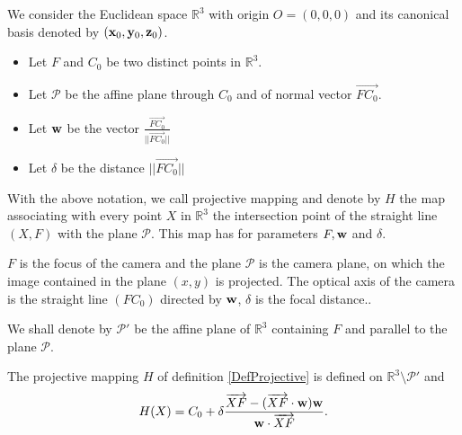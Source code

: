 We consider the Euclidean space $\mathbb{R}^3$ with origin $O=(0,0,0)$ and its canonical basis denoted by $(\mathbf{x}_0,\mathbf{y}_0,\mathbf{z}_0)$.
\begin{itemize}
\item Let $F$ and $C_0$ be two distinct points in $\mathbb{R}^{3}$.
\item Let $\mathcal{P}$ be the affine plane through $C_0$ and of normal vector $\overrightarrow{FC_0}$.
\item Let $\mathbf{w}$ be the vector $\frac{\overrightarrow{FC_0}}{|| \overrightarrow{FC_0}||}$
\item Let $\delta$ be the distance $|| \overrightarrow{FC_0}||$
\end{itemize}

\begin{Def}
With the above notation, we call projective mapping  and denote by $H$  the map associating with every point $X$ in $\mathbb{R}^3$ the intersection point of the straight line $(X, F)$ with the plane $\mathcal{P}$. This map has for parameters $F, \mathbf{w}$ and $\delta$.
\label{DefProjective}
\end{Def}

\begin{remarque}
$F$ is the focus of the camera and the plane $\mathcal{P}$ is the camera plane, on which the image contained in the plane $(x,y)$ is projected. The optical axis of the camera is the straight line $(FC_0)$ directed by $\mathbf{w}$, $\delta$ is the focal distance..
\end{remarque}

We shall denote by $\mathcal{P}'$ be the affine plane of $\mathbb{R}^{3}$ containing $F$ and parallel to the plane $\mathcal{P}$.
\begin{lem}
The projective mapping  $H$ of definition \ref{DefProjective} is defined on $\mathbb{R}^3 \setminus \mathcal{P}'$ and
\begin{equation}
H(X) = C_0 +  \delta \frac{\overrightarrow{XF}-(\overrightarrow{XF}\cdot \mathbf{w} )\mathbf{w}}{\mathbf{w} \cdot \overrightarrow{XF}}. 
\label{formul_lem_app_proj}
\end{equation}
\label{lem_app_proj}
\end{lem}

